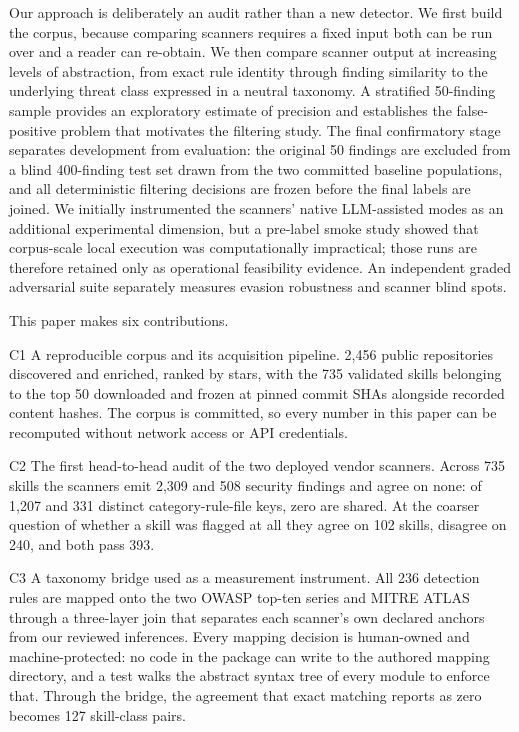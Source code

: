 \documentclass[conference]{IEEEtran}
\begin{document}
Our approach is deliberately an audit rather than a new detector. We first build the corpus, because comparing scanners requires a fixed input both can be run over and a reader can re-obtain. We then compare scanner output at increasing levels of abstraction, from exact rule identity through finding similarity to the underlying threat class expressed in a neutral taxonomy. A stratified 50-finding sample provides an exploratory estimate of precision and establishes the false-positive problem that motivates the filtering study. The final confirmatory stage separates development from evaluation: the original 50 findings are excluded from a blind 400-finding test set drawn from the two committed baseline populations, and all deterministic filtering decisions are frozen before the final labels are joined. We initially instrumented the scanners' native LLM-assisted modes as an additional experimental dimension, but a pre-label smoke study showed that corpus-scale local execution was computationally impractical; those runs are therefore retained only as operational feasibility evidence. An independent graded adversarial suite separately measures evasion robustness and scanner blind spots.

This paper makes six contributions.

C1  A reproducible corpus and its acquisition pipeline.  2,456 public repositories discovered and enriched, ranked by stars, with the 735 validated skills belonging to the top 50 downloaded and frozen at pinned commit SHAs alongside recorded content hashes. The corpus is committed, so every number in this paper can be recomputed without network access or API credentials.

C2  The first head-to-head audit of the two deployed vendor scanners.  Across 735 skills the scanners emit 2,309 and 508 security findings and agree on none: of 1,207 and 331 distinct category-rule-file keys, zero are shared. At the coarser question of whether a skill was flagged at all they agree on 102 skills, disagree on 240, and both pass 393.

C3  A taxonomy bridge used as a measurement instrument.  All 236 detection rules are mapped onto the two OWASP top-ten series and MITRE ATLAS through a three-layer join that separates each scanner's own declared anchors from our reviewed inferences. Every mapping decision is human-owned and machine-protected: no code in the package can write to the authored mapping directory, and a test walks the abstract syntax tree of every module to enforce that. Through the bridge, the agreement that exact matching reports as zero becomes 127 skill-class pairs.
\end{document}
